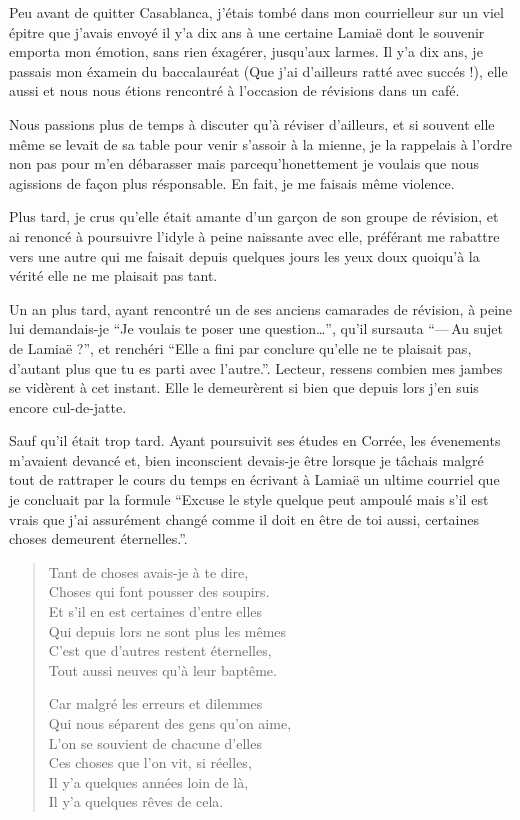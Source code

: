 \begin{prose}
Peu avant de quitter Casablanca, j’étais tombé dans mon courrielleur sur un viel épitre que j’avais envoyé il y’a dix ans à une certaine Lamiaë dont le souvenir emporta mon émotion, sans rien éxagérer, jusqu’aux larmes. Il y’a dix ans, je passais mon éxamein du baccalauréat (Que j’ai d’ailleurs ratté avec succés !), elle aussi et nous nous étions rencontré à l’occasion de révisions dans un café.

Nous passions plus de temps à discuter qu’à réviser d’ailleurs, et si souvent elle même se levait de sa table pour venir s’assoir à la mienne, je la rappelais à l’ordre non pas pour m’en débarasser mais parcequ’honettement je voulais que nous agissions de façon plus résponsable. En fait, je me faisais même violence.

Plus tard, je crus qu’elle était amante d’un garçon de son groupe de révision, et ai renoncé à poursuivre l’idyle à peine naissante avec elle, préférant me rabattre vers une autre qui me faisait depuis quelques jours les yeux doux quoiqu’à la vérité elle ne me plaisait pas tant.

Un an plus tard, ayant rencontré un de ses anciens camarades de révision, à peine lui demandais-je \enquote{Je voulais te poser une question…}, qu’il sursauta \enquote{—\,Au sujet de Lamiaë ?}, et renchéri \enquote{Elle a fini par conclure qu’elle ne te plaisait pas, d’autant plus que tu es parti avec l’autre.}. Lecteur, ressens combien mes jambes se vidèrent à cet instant. Elle le demeurèrent si bien que depuis lors j’en suis encore cul-de-jatte.

Sauf qu’il était trop tard. Ayant poursuivit ses études en Corrée, les évenements m’avaient devancé et, bien inconscient devais-je être lorsque je tâchais malgré tout de rattraper le cours du temps  en écrivant à Lamiaë un ultime courriel que je concluait par la formule \enquote{Excuse le style quelque peut ampoulé mais s’il est vrais que j’ai assurément changé comme il doit en être de toi aussi, certaines choses demeurent éternelles.}.
\end{prose}

\begin{verse}
Tant de choses avais-je à te dire,\\
Choses qui font pousser des soupirs.\\
Et s’il en est certaines d’entre elles\\
Qui depuis lors ne sont plus les mêmes\\
C’est que d’autres restent éternelles,\\
Tout aussi neuves qu’à leur baptême.

Car malgré les erreurs et dilemmes\\
Qui nous séparent des gens qu’on aime,\\
L’on se souvient de chacune d’elles\\
Ces choses que l’on vit, si réelles,\\
Il y’a quelques années loin de là,\\
Il y’a quelques rêves de cela.
\end{verse}


